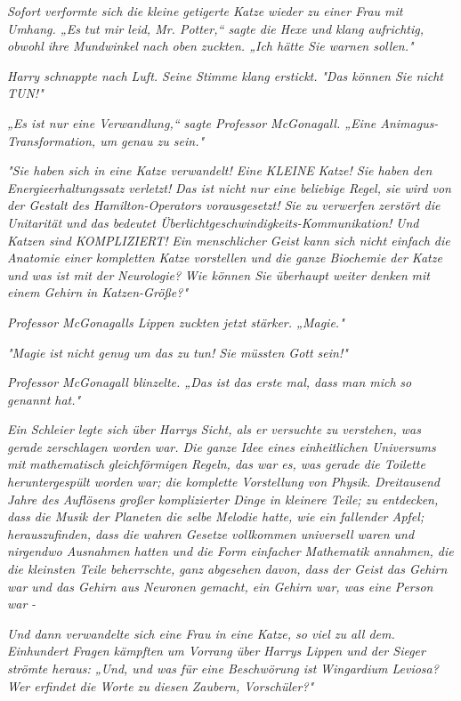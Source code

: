 {\emph{Sofort verformte sich die kleine getigerte Katze wieder zu einer Frau mit Umhang. „Es tut mir leid, Mr. Potter,“ sagte die Hexe und klang aufrichtig, obwohl ihre Mundwinkel nach oben zuckten. „Ich hätte Sie warnen sollen."}

\emph{Harry schnappte nach Luft. Seine Stimme klang erstickt.} \emph{\emph{"Das können Sie nicht TUN!"}}

\emph{„Es ist nur eine Verwandlung,“ sagte Professor McGonagall. „Eine Animagus-Transformation, um genau zu sein."}

\emph{"Sie haben sich in eine Katze verwandelt! Eine} \emph{\emph{KLEINE}} \emph{Katze! Sie haben den Energieerhaltungssatz verletzt!} \emph{Das ist nicht nur eine beliebige Regel, sie wird von der Gestalt des Hamilton-Operators vorausgesetzt! Sie zu verwerfen zerstört die Unitarität und das bedeutet Überlichtgeschwindigkeits-Kommunikation!} \emph{Und Katzen sind} \emph{\emph{KOMPLIZIERT!}} \emph{Ein menschlicher Geist kann sich nicht einfach die Anatomie einer kompletten Katze vorstellen und die ganze Biochemie der Katze und was ist mit der} \emph{\emph{Neurologie?}} \emph{Wie können Sie überhaupt weiter} \emph{\emph{denken}} \emph{mit einem Gehirn in Katzen-Größe?"}

\emph{Professor McGonagalls Lippen zuckten jetzt stärker. „Magie."}

\emph{"Magie} \emph{\emph{ist nicht genug}} \emph{um das zu tun! Sie müssten Gott sein!"}

\emph{Professor McGonagall blinzelte. „Das ist das erste mal, dass man mich} \emph{\emph{so}} \emph{genannt hat."}

\emph{Ein Schleier legte sich über Harrys Sicht, als er versuchte zu verstehen, was gerade zerschlagen worden war. Die ganze Idee eines einheitlichen Universums mit} \emph{mathematisch gleichförmigen Regeln, das war es, was gerade die Toilette heruntergespült worden war; die komplette Vorstellung von} \emph{\emph{Physik}. Dreitausend Jahre des Auflösens großer komplizierter Dinge in kleinere Teile; zu entdecken, dass die Musik der Planeten die selbe Melodie hatte, wie ein fallender Apfel; herauszufinden, dass die wahren Gesetze vollkommen universell waren und nirgendwo Ausnahmen hatten und die Form einfacher Mathematik annahmen, die die kleinsten Teile beherrschte,} \emph{\emph{ganz abgesehen davon}, dass der Geist das Gehirn war und das Gehirn aus Neuronen gemacht, ein Gehirn war, was eine Person} \emph{\emph{war}} \emph{-}

\emph{Und dann verwandelte sich eine Frau in eine Katze, so viel zu all dem.}\\ \emph{Einhundert Fragen kämpften} \emph{um Vorrang über Harrys Lippen und der Sieger strömte heraus: „Und, und was für eine Beschwörung ist} \emph{\emph{Wingardium Leviosa?}} \emph{Wer erfindet die Worte zu diesen Zaubern, Vorschüler?"}

}
